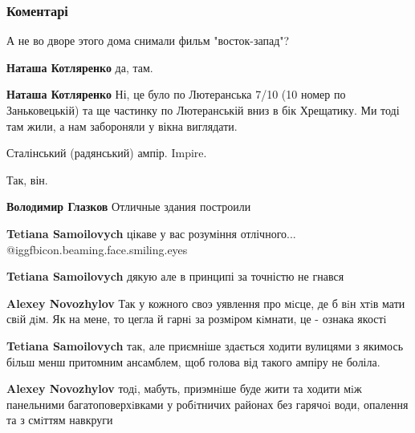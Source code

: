  
 
 
 
 
\subsubsection{Коментарі}

\begin{itemize} %
А не во дворе этого дома снимали фильм "восток-запад"?

\begin{itemize} %
\textbf{Наташа Котляренко} да, там.

\textbf{Наташа Котляренко} Ні, це було по Лютеранська 7/10 (10 номер по Заньковецькій) та ще частинку по Лютеранській вниз в бік Хрещатику. Ми тоді там жили, а нам забороняли у вікна виглядати.
\end{itemize} %

Сталінський (радянський) ампір.
Impire.

\begin{itemize} %
Так, він.

\textbf{Володимир Глазков} Отличные здания построили

\begin{itemize} %
\textbf{Tetiana Samoilovych} цікаве у вас розуміння отлічного... @igg{fbicon.beaming.face.smiling.eyes} 

\textbf{Tetiana Samoilovych} дякую але в принципі за точністю не гнався

\textbf{Alexey Novozhylov} Так у кожного своэ уявлення про мiсце, де б вiн хтiв мати свiй дiм. Як на мене, то цегла й гарнi за розмiром кiмнати, це - ознака якостi

\textbf{Tetiana Samoilovych} так, але приємніше здається ходити вулицями з якимось більш менш притомним ансамблем, щоб голова від такого ампіру не боліла.

\textbf{Alexey Novozhylov} тодi, мабуть, приэмнiше буде жити та ходити мiж панельними багатоповерхiвками у робiтничих районах без гарячоi води, опалення та з смiттям навкруги


\end{itemize}
\end{itemize}
\end{itemize}
